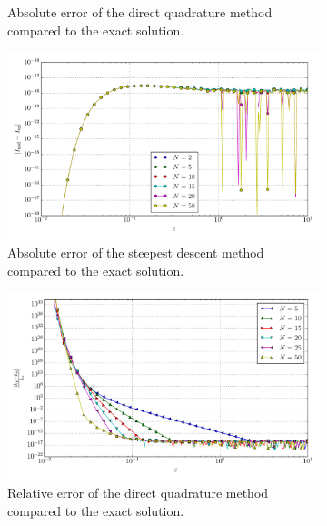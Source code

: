 \documentclass[a4paper,10pt]{article}
\begin{document}
\begin{figure}[ht!]
\begin{subfigure}[t]{0.5\linewidth}
    \caption{Absolute error of the direct quadrature method compared to the exact solution.}
    \label{fig:tp_1d_conv_eps_0_0_err_qr}
  \end{subfigure}
  \begin{subfigure}[t]{0.5\linewidth}
    \includegraphics[width=\linewidth]{./plots/tp_1d_conv_eps_0_0_err_nsd.pdf}
    \caption{Absolute error of the steepest descent method compared to the exact solution.}
    \label{fig:tp_1d_conv_eps_0_0_err_nsd}
  \end{subfigure}
  \begin{subfigure}[t]{0.5\linewidth}
    \includegraphics[width=\linewidth]{./plots/tp_1d_conv_eps_0_0_err_rel_qr.pdf}
    \caption{Relative error of the direct quadrature method compared to the exact solution.}
    \label{fig:tp_1d_conv_eps_0_0_err_rel_qr}
  \end{subfigure}
  \begin{subfigure}[t]{0.5\linewidth}

\end{subfigure}
\end{figure}
\end{document}
